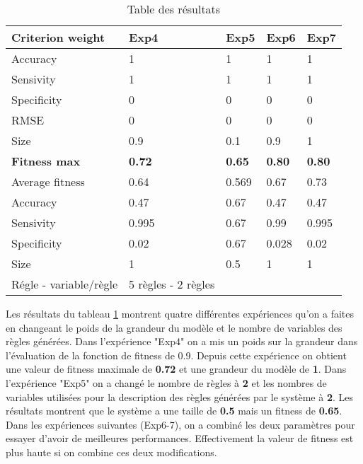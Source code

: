 \begin{table}[h]
  \centering
  \begin{tabular}{|l|l|l|l|l|}
  \hline
  \textbf{Criterion weight} & \textbf{Exp4} & \textbf{Exp5} & \textbf{Exp6} & \textbf{Exp7} \\ \hline
  Accuracy                 & 1             & 1             & 1             & 1             \\ \hline
  Sensivity                & 1             & 1             & 1             & 1             \\ \hline
  Specificity              & 0             & 0             & 0             & 0             \\ \hline
  RMSE                     & 0             & 0             & 0             & 0             \\ \hline
  Size                     & 0.9           & 0.1           & 0.9           & 1             \\ \hline
  \textbf{Fitness max}     & \textbf{0.72} & \textbf{0.65} & \textbf{0.80} & \textbf{0.80} \\ \hline
  Average fitness          & 0.64          & 0.569         & 0.67          & 0.73          \\ \hline
  Accuracy                 & 0.47          & 0.67          & 0.47          & 0.47          \\ \hline
  Sensivity                & 0.995         & 0.67          & 0.99          & 0.995         \\ \hline
  Specificity              & 0.02          & 0.67          & 0.028         & 0.02          \\ \hline
  Size                     & 1             & 0.5           & 1             & 1             \\ \hline
  Régle - variable/règle  & 5 règles - 2 règles      &        &               &               \\ \hline
  \end{tabular}
  \caption{\label{table4}Table des résultats}
\end{table}

Les résultats du tableau \ref{table4} montrent quatre différentes expériences qu’on a faites en changeant le poids de la grandeur du modèle et le nombre de variables des règles générées. Dans l'expérience "Exp4" on a mis un poids sur la grandeur dans l'évaluation de la fonction de fitness de 0.9. Depuis cette expérience on obtient une valeur de fitness maximale de \textbf{0.72} et une grandeur du modèle de \textbf{1}. Dans l'expérience "Exp5" on a changé le nombre de règles à \textbf{2} et les nombres de variables utilisées pour la description des règles générées par le système à \textbf{2}. Les résultats montrent que le système a une taille de \textbf{0.5} mais un fitness de \textbf{0.65}.
Dans les expériences suivantes (Exp6-7), on a combiné les deux paramètres pour essayer d'avoir de meilleures performances. Effectivement la valeur de fitness est plus haute si on combine ces deux modifications.


